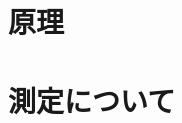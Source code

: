 \documentclass[uplatex,a4j,11pt,dvipdfmx]{jsarticle}
\newcommand{\gnu}[2]{
\begin{figure}[hptb]
\begin{center}

\caption{#1}
\label{fig:#2}
\end{center}
\end{figure}
}
\begin{document}
\section{原理}



\section{測定について}








\end{document}
